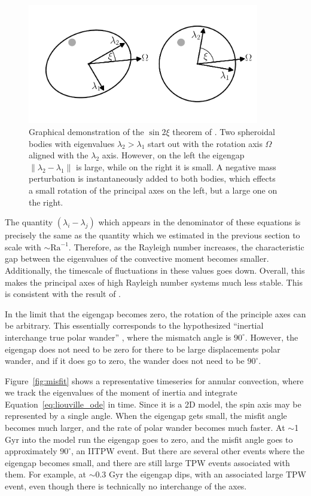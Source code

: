 \documentclass[preprint,12pt,authoryear]{elsarticle}
\begin{document}
\begin{figure}
\centering
\includegraphics[width=0.9\textwidth]{figures/perturb.pdf}
\caption[Graphical demonstration of the $\sin{2 \xi}$ theorem of \citet{davis1970rotation}.] {Graphical demonstration of the $\sin{2 \xi}$ theorem of \citet{davis1970rotation}.  Two spheroidal bodies with eigenvalues $\lambda_2 > \lambda_1$ start out with the rotation axis $\Omega$ aligned with the $\lambda_2$ axis. However, on the left the eigengap $\lVert \lambda_2 - \lambda_1 \rVert$ is large, while on the right it is small.  A negative mass perturbation is instantaneously added to both bodies, which effects a small rotation of the principal axes on the left, but a large one on the right.}
\label{fig:perturb}
\end{figure}

The quantity $(\lambda_i-\lambda_j)$ which appears in the denominator of these equations is precisely the same as the quantity which we estimated in the previous section to scale with $\sim \mathrm{Ra}^{-1}$.
Therefore, as the Rayleigh number increases, the characteristic gap between the eigenvalues of the convective moment becomes smaller.  
Additionally, the timescale of fluctuations in these values goes down. 
Overall, this makes the principal axes of high Rayleigh number systems much less stable.
This is consistent with the result of \citet{richards1999polar}.

In the limit that the eigengap becomes zero, the rotation of the principle axes can be arbitrary. 
This essentially corresponds to the hypothesized ``inertial interchange true polar wander'' \citep{kirschvink1997evidence}, where 
the mismatch angle is $90^\circ$. However, the eigengap does not need to be zero for there to be large displacements polar wander, 
and if it does go to zero, the wander does not need to be $90^\circ$.

Figure~\ref{fig:misfit} shows a representative timeseries for annular convection, where 
we track the eigenvalues of the moment of inertia and integrate Equation~\eqref{eq:liouville_ode} in time.
Since it is a 2D model, the spin axis may be represented by a single angle.
When the eigengap gets small, the misfit angle becomes much larger, and the rate of polar wander becomes much faster.
At $\sim$1 Gyr into the model run the eigengap goes to zero, and the misfit angle goes to approximately $90^\circ$, 
an IITPW event. But there are several other events where the eigengap becomes small, and there are 
still large TPW events associated with them.
For example, at $\sim$0.3 Gyr the eigengap dips, with an associated large TPW event, even though
there is technically no interchange of the axes.
\end{document}
